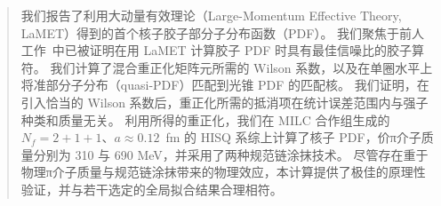 \begin{abstract}
我们报告了利用大动量有效理论（Large-Momentum Effective Theory, LaMET）得到的首个核子胶子部分子分布函数（PDF）。
我们聚焦于前人工作~\cite{Good:2024iur}中已被证明在用 LaMET 计算胶子 PDF 时具有最佳信噪比的胶子算符。
我们计算了混合重正化矩阵元所需的 Wilson 系数，以及在单圈水平上将准部分子分布（quasi-PDF）匹配到光锥 PDF 的匹配核。
我们证明，在引入恰当的 Wilson 系数后，重正化所需的抵消项在统计误差范围内与强子种类和质量无关。
利用所得的重正化，我们在 MILC 合作组生成的 $N_f=2+1+1$、$a \approx 0.12$~fm 的 HISQ 系综上计算了核子 PDF，价π介子质量分别为 310 与 690 MeV，并采用了两种规范链涂抹技术。
尽管存在重于物理π介子质量与规范链涂抹带来的物理效应，本计算提供了极佳的原理性验证，并与若干选定的全局拟合结果合理相符。
\end{abstract}
